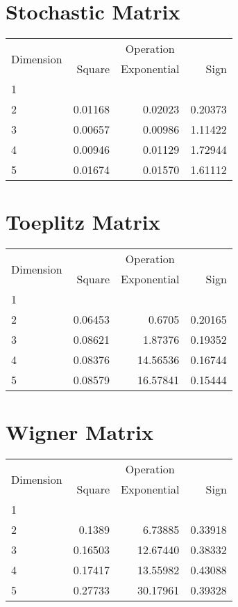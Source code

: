 \documentclass{article}
\begin{document}
\section{Stochastic Matrix}
\begin{tabular}{@{}lrrr@{}}
\toprule
\multirow{2}{*}{Dimension} & \multicolumn{3}{c}{Operation} \\
\cmidrule(l){2-4}
& Square & Exponential & Sign \\
\midrule
1 & & & \\
2 & 0.01168 & 0.02023 & 0.20373 \\
3 & 0.00657 & 0.00986 & 1.11422 \\
4 & 0.00946 & 0.01129 & 1.72944 \\
5 & 0.01674 & 0.01570 & 1.61112 \\
\bottomrule
\end{tabular}

\section{Toeplitz Matrix}
\begin{tabular}{@{}lrrr@{}}
\toprule
\multirow{2}{*}{Dimension} & \multicolumn{3}{c}{Operation} \\
\cmidrule(l){2-4}
& Square & Exponential & Sign \\
\midrule
1 & & & \\
2 & 0.06453 & 0.6705 & 0.20165 \\
3 & 0.08621 & 1.87376 & 0.19352 \\
4 & 0.08376 & 14.56536 & 0.16744 \\
5 & 0.08579 & 16.57841 & 0.15444 \\
\bottomrule
\end{tabular}

\section{Wigner Matrix}
\begin{tabular}{@{}lrrr@{}}
\toprule
\multirow{2}{*}{Dimension} & \multicolumn{3}{c}{Operation} \\
\cmidrule(l){2-4}
& Square & Exponential & Sign \\
\midrule
1 & & & \\
2 & 0.1389 & 6.73885 & 0.33918 \\
3 & 0.16503 & 12.67440 & 0.38332 \\
4 & 0.17417 & 13.55982 & 0.43088 \\
5 & 0.27733 & 30.17961 & 0.39328 \\
\bottomrule
\end{tabular}
\end{document}
